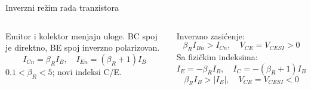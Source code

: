 \begin{frame}[label=10-s052]{Inverzni režim rada tranzistora}
\setlength{\abovedisplayskip}{4pt}\setlength{\belowdisplayskip}{4pt}\setlength{\abovedisplayshortskip}{3pt}\setlength{\belowdisplayshortskip}{3pt}
\begin{columns}[T,onlytextwidth]\par\medskip{}\centering \raggedright
Emitor i kolektor menjaju uloge. BC spoj je direktno, BE spoj inverzno polarizovan.
\[I_{Cn}=\beta_RI_B,\quad I_{En}=(\beta_R+1)I_B\]
$0.1<\beta_R<5$; novi indeksi C/E.\par
Inverzno zasićenje:
\[\beta_RI_{Bn}>I_{Cn},\quad V_{CE}=V_{CESI}>0\]
Sa fizičkim indeksima:
\[I_E=-\beta_RI_B,\quad I_C=-(\beta_R+1)I_B\]
\[\beta_RI_B>|I_E|,\quad V_{CE}=V_{CESI}<0\]\end{columns}
\end{frame}
